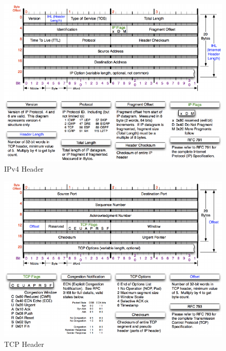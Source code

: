 \documentclass[11pt,]{article}
\begin{document}
\clearpage

\begin{figure}

{\centering \includegraphics{thesis_files/figure-latex/unnamed-chunk-6-1} 

}

\caption{IPv4 Header}\label{fig:unnamed-chunk-6}
\end{figure}

\begin{figure}

{\centering \includegraphics{thesis_files/figure-latex/unnamed-chunk-7-1} 

}

\caption{TCP Header}\label{fig:unnamed-chunk-7}
\end{figure}
\end{document}
